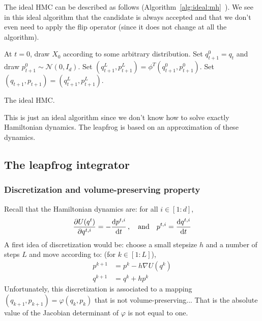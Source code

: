 \documentclass[english,graybox,envcountchap,envcountsame,sectrefs,shortlabels]{svmono}
\theoremstyle{style}
\newcommand{\gauss}{\mathcal{N}}
\begin{document}
The ideal HMC can be described as follows (Algorithm~\ref{alg:ideal:mh}~). We see in this ideal algorithm that the candidate is always accepted and that we don't even need to apply the flip operator (since it does not change at all the algorithm).

\begin{algorithm}
\centering
\begin{algorithmic}
\State At $t=0$, draw $X_{0}$ according to some arbitrary distribution.
\State Set $q_{t+1}^0=q_{t}$ and draw $p_{t+1}^0\sim \gauss(0,I_d)$.
\State Set  $(q_{t+1}^L,p_{t+1}^L)=\phi^T(q_{t+1}^0,p_{t+1}^0)$.
\State Set $(q_{t+1},p_{t+1})=(q_{t+1}^L,p_{t+1}^L)$.
\EndFor
\end{algorithmic}
\label{alg:ideal:mh}
\caption{The ideal HMC.}
\end{algorithm}


This is just an ideal algorithm since we don't know how to solve exactly Hamiltonian dynamics. The leapfrog is based on an approximation of these dynamics.


\subsection{The leapfrog integrator}
\subsubsection{Discretization and volume-preserving property}
Recall that the Hamiltonian dynamics are: for all $i \in [1:d]$,
$$
\frac{\partial U(q^t)}{\partial q^{t,i}}=-\frac{\mathrm{d} p^{t,i}}{\mathrm{d} t}\,,  \quad \mbox{and} \quad
p^{t,i}=\frac{\mathrm{d} q^{t,i}}{\mathrm{d} t}
$$
A first idea of discretization would be:  choose a small stepsize $h$ and a number of steps $L$ and move according to: (for $k \in[1:L]$),
\begin{align*}
p^{k+1}&=p^{k}-h \nabla U (q^{k})\\
q^{k+1}&=q^k+h p^{k}
\end{align*}
Unfortunately, this discretization is associated to a mapping $(q_{k+1},p_{k+1})=\varphi(q_k,p_k)$ that is not volume-preserving... That is the absolute value of the Jacobian determinant of $\varphi$ is not equal to one.
\end{document}
